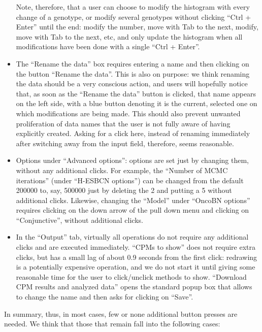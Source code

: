 \documentclass[a4paper,11pt]{article}
\begin{document}
\begin{itemize}
  Note, therefore, that a user can choose to modify the histogram with every change of a genotype, or modify several genotypes without clicking ``Ctrl + Enter'' until the end: modify the number,  move with Tab to the next, modify, move with Tab to the next, etc, and only update the histogram when all modifications have been done with a single ``Ctrl + Enter''.



\item The ``Rename the data'' box requires entering a name and then clicking on the button ``Rename the data''. This is also on purpose: we think renaming the data should be a very conscious action, and users will hopefully notice that, as soon as the ``Rename the data'' button is clicked, that name appears on the left side, with a blue button denoting it is the current, selected one on which modifications are being made. This should also prevent unwanted proliferation of data names that the user is not fully aware of having explicitly created.  Asking for a click here, instead of renaming immediately after switching away from the input field, therefore, seems reasonable. 

\item Options under ``Advanced options'': options are set just by changing them, without any additional clicks. For example, the ``Number of MCMC iterations'' (under ``H-ESBCN options'') can be changed from the default 200000 to, say, 500000 just by deleting the 2 and putting a 5 without additional clicks. Likewise, changing the ``Model'' under ``OncoBN options'' requires clicking on the down arrow of the pull down menu and clicking on ``Conjunctive'', without additional clicks.


\item In the ``Output'' tab, virtually all operations do not require any additional clicks and are executed immediately. ``CPMs to show'' does not require extra clicks, but has a small lag of about 0.9 seconds from the first click: redrawing is a potentially expensive operation, and we do not start it until giving some reasonable time for the user to click/unclick methods to show. ``Download CPM results and analyzed data'' opens the standard popup box that allows to change the name and then asks for clicking on ``Save''.
  
  
\end{itemize}



In summary, thus, in most cases, few or none additional button presses are needed. We think that those that remain fall into the following cases:
\end{document}
